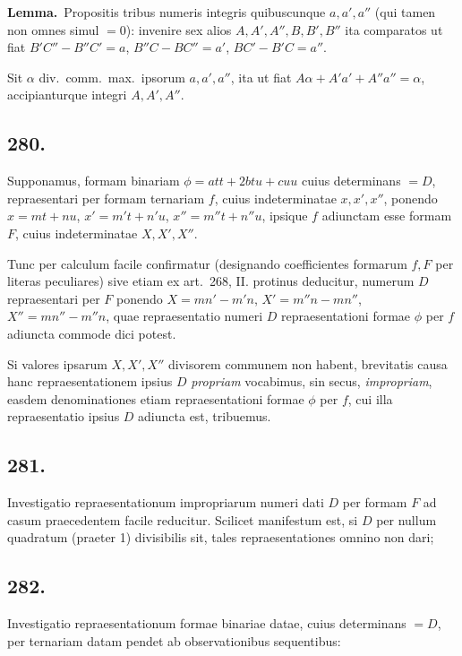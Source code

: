 \documentclass[12pt,a4paper]{article}
\theoremstyle{plain}
\theoremstyle{definition}
\theoremstyle{remark}
\begin{document}
\textbf{Lemma.}\ Propositis tribus numeris integris quibuscunque $a, a', a''$ (qui tamen non omnes simul $= 0$): invenire sex alios $A, A', A'', B, B', B''$ ita comparatos ut fiat $B'C'' - B''C' = a$, $B''C - BC'' = a'$, $BC' - B'C = a''$.

Sit $\alpha$ div.\ comm.\ max.\ ipsorum $a, a', a''$, ita ut fiat $A\alpha + A'a' + A''a'' = \alpha$, accipianturque integri $A, A', A''$.

\subsection*{280.}

Supponamus, formam binariam $\phi = att + 2btu + cuu$ cuius determinans $= D$, repraesentari per formam ternariam $f$, cuius indeterminatae $x, x', x''$, ponendo $x = mt + nu$, $x' = m't + n'u$, $x'' = m''t + n''u$, ipsique $f$ adiunctam esse formam $F$, cuius indeterminatae $X, X', X''$.

Tunc per calculum facile confirmatur (designando coefficientes formarum $f, F$ per literas peculiares) sive etiam ex art.\ 268, II. protinus deducitur, numerum $D$ repraesentari per $F$ ponendo $X = mn' - m'n$, $X' = m''n - mn''$, $X'' = mn'' - m''n$, quae repraesentatio numeri $D$ repraesentationi formae $\phi$ per $f$ adiuncta commode dici potest.

Si valores ipsarum $X, X', X''$ divisorem communem non habent, brevitatis causa hanc repraesentationem ipsius $D$ \emph{propriam} vocabimus, sin secus, \emph{impropriam}, easdem denominationes etiam repraesentationi formae $\phi$ per $f$, cui illa repraesentatio ipsius $D$ adiuncta est, tribuemus.

\subsection*{281.}

Investigatio repraesentationum impropriarum numeri dati $D$ per formam $F$ ad casum praecedentem facile reducitur. Scilicet manifestum est, si $D$ per nullum quadratum (praeter 1) divisibilis sit, tales repraesentationes omnino non dari;

\subsection*{282.}

Investigatio repraesentationum formae binariae datae, cuius determinans $= D$, per ternariam datam pendet ab observationibus sequentibus:
\end{document}
